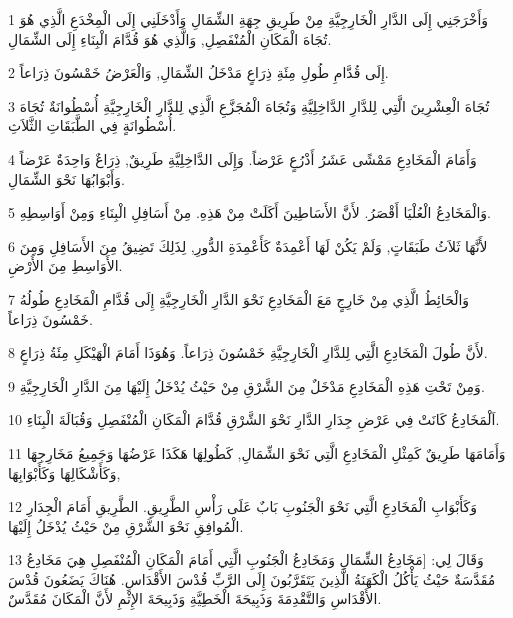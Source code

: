\par 1 وَأَخْرَجَنِي إِلَى الدَّارِ الْخَارِجِيَّةِ مِنْ طَرِيقِ جِهَةِ الشِّمَالِ وَأَدْخَلَنِي إِلَى الْمِخْدَعِ الَّذِي هُوَ تُجَاهَ الْمَكَانِ الْمُنْفَصِلِ, وَالَّذِي هُوَ قُدَّامَ الْبِنَاءِ إِلَى الشِّمَالِ.
\par 2 إِلَى قُدَّامِ طُولِ مِئَةِ ذِرَاعٍ مَدْخَلُ الشِّمَالِ, وَالْعَرْضُ خَمْسُونَ ذِرَاعاً.
\par 3 تُجَاهَ الْعِشْرِينَ الَّتِي لِلدَّارِ الدَّاخِلِيَّةِ وَتُجَاهَ الْمُجَزَّعِ الَّذِي لِلدَّارِ الْخَارِجِيَّةِ أُسْطُوانَةٌ تُجَاهَ أُسْطُوانَةٍ فِي الطَّبَقَاتِ الثَّلاَثِ.
\par 4 وَأَمَامَ الْمَخَادِعِ مَمْشًى عَشَرُ أَذْرُعٍ عَرْضاً. وَإِلَى الدَّاخِلِيَّةِ طَرِيقٌ, ذِرَاعٌ وَاحِدَةٌ عَرْضاً وَأَبْوَابُهَا نَحْوَ الشِّمَالِ.
\par 5 وَالْمَخَادِعُ الْعُلْيَا أَقْصَرُ. لأَنَّ الأَسَاطِينَ أَكَلَتْ مِنْ هَذِهِ. مِنْ أَسَافِلِ الْبِنَاءِ وَمِنْ أَوَاسِطِهِ.
\par 6 لأَنَّهَا ثَلاَثُ طَبَقَاتٍ, وَلَمْ يَكُنْ لَهَا أَعْمِدَةٌ كَأَعْمِدَةِ الدُّورِ, لِذَلِكَ تَضِيقُ مِنَ الأَسَافِلِ وَمِنَ الأَوَاسِطِ مِنَ الأَرْضِ.
\par 7 وَالْحَائِطُ الَّذِي مِنْ خَارِجٍ مَعَ الْمَخَادِعِ نَحْوَ الدَّارِ الْخَارِجِيَّةِ إِلَى قُدَّامِ الْمَخَادِعِ طُولُهُ خَمْسُونَ ذِرَاعاً.
\par 8 لأَنَّ طُولَ الْمَخَادِعِ الَّتِي لِلدَّارِ الْخَارِجِيَّةِ خَمْسُونَ ذِرَاعاً. وَهُوَذَا أَمَامَ الْهَيْكَلِ مِئَةُ ذِرَاعٍ.
\par 9 وَمِنْ تَحْتِ هَذِهِ الْمَخَادِعِ مَدْخَلٌ مِنَ الشَّرْقِ مِنْ حَيْثُ يُدْخَلُ إِلَيْهَا مِنَ الدَّارِ الْخَارِجِيَّةِ.
\par 10 اَلْمَخَادِعُ كَانَتْ فِي عَرْضِ جِدَارِ الدَّارِ نَحْوَ الشَّرْقِ قُدَّامَ الْمَكَانِ الْمُنْفَصِلِ وَقُبَالَةَ الْبِنَاءِ.
\par 11 وَأَمَامَهَا طَرِيقٌ كَمِثْلِ الْمَخَادِعِ الَّتِي نَحْوَ الشِّمَالِ, كَطُولِهَا هَكَذَا عَرْضُهَا وَجَمِيعُ مَخَارِجِهَا وَكَأَشْكَالِهَا وَكَأَبْوَابِهَا,
\par 12 وَكَأَبْوَابِ الْمَخَادِعِ الَّتِي نَحْوَ الْجَنُوبِ بَابٌ عَلَى رَأْسِ الطَّرِيقِ. الطَّرِيقِ أَمَامَ الْجِدَارِ الْمُوافِقِ نَحْوَ الشَّرْقِ مِنْ حَيْثُ يُدْخَلُ إِلَيْهَا.
\par 13 وَقَالَ لِي: [مَخَادِعُ الشِّمَالِ وَمَخَادِعُ الْجَنُوبِ الَّتِي أَمَامَ الْمَكَانِ الْمُنْفَصِلِ هِيَ مَخَادِعُ مُقَدَّسَةٌ حَيْثُ يَأْكُلُ الْكَهَنَةُ الَّذِينَ يَتَقَرَّبُونَ إِلَى الرَّبِّ قُدْسَ الأَقْدَاسِ. هُنَاكَ يَضَعُونَ قُدْسَ الأَقْدَاسِ وَالتَّقْدِمَةَ وَذَبِيحَةَ الْخَطِيَّةِ وَذَبِيحَةَ الإِثْمِ لأَنَّ الْمَكَانَ مُقَدَّسٌ.

